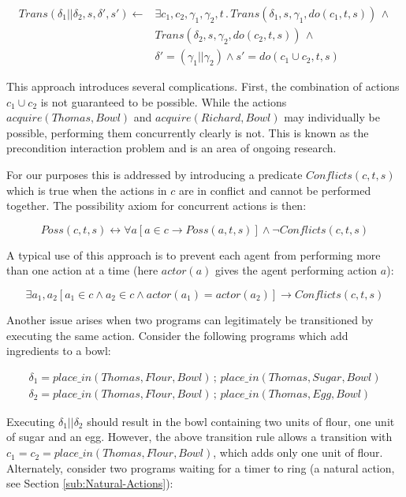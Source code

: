 \documentclass{llncs}
\begin{document}
\begin{align*}
Trans(\delta_{1}||\delta_{2},s,\delta',s')\leftarrow & \exists c_{1},c_{2},\gamma_{1},\gamma_{2},t\,.\, Trans(\delta_{1},s,\gamma_{1},do(c_{1},t,s))\,\wedge\\
 & Trans(\delta_{2},s,\gamma_{2},do(c_{2},t,s))\,\wedge\\
 & \delta'=(\gamma_{1}||\gamma_{2})\wedge s'=do(c_{1}\cup c_{2},t,s)
\end{align*}


This approach introduces several complications. First, the combination
of actions $c_{1}\cup c_{2}$ is not guaranteed to be possible. While
the actions $acquire(Thomas,Bowl)$ and $acquire(Richard,Bowl)$ may
individually be possible, performing them concurrently clearly is
not. This is known as the precondition interaction problem \cite{pinto94temporal}
and is an area of ongoing research.

For our purposes this is addressed by introducing a predicate $Conflicts(c,t,s)$
which is true when the actions in $c$ are in conflict and cannot
be performed together. The possibility axiom for concurrent actions
is then:

\[
Poss(c,t,s)\leftrightarrow\forall a\left[a\in c\rightarrow Poss(a,t,s)\right]\wedge\neg Conflicts(c,t,s)
\]


A typical use of this approach is to prevent each agent from performing
more than one action at a time (here $actor(a)$ gives the agent performing
action $a$):

\[
\exists a_{1},a_{2}\left[a_{1}\in c\wedge a_{2}\in c\wedge actor(a_{1})=actor(a_{2})\right]\rightarrow Conflicts(c,t,s)
\]

Another issue arises when two programs can legitimately be transitioned
by executing the same action. Consider the following programs which
add ingredients to a bowl:

\begin{align*}
\delta_{1}=place\_ in(Thomas,Flour,Bowl)\,;\, place\_ in(Thomas,Sugar,Bowl)\\
\delta_{2}=place\_ in(Thomas,Flour,Bowl)\,;\, place\_ in(Thomas,Egg,Bowl)
\end{align*}


Executing $\delta_{1}||\delta_{2}$ should result in the bowl containing
two units of flour, one unit of sugar and an egg. However, the above
transition rule allows a transition with $c_{1}=c_{2}=place\_ in(Thomas,Flour,Bowl)$,
which adds only one unit of flour. Alternately, consider two programs
waiting for a timer to ring (a natural action, see Section \ref{sub:Natural-Actions}):
\end{document}
